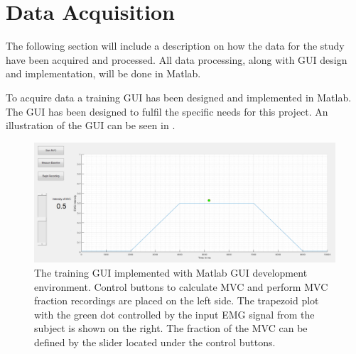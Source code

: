 \section{Data Acquisition}

The following section will include a description on how the data for the study have been acquired and processed. All data processing, along with GUI design and implementation, will be done in Matlab.

To acquire data a training GUI has been designed and implemented in Matlab. The GUI has been designed to fulfil the specific needs for this project. An illustration of the GUI can be seen in . 

\begin{figure}[H]
	\includegraphics[width=.9\textwidth]{figures/GUI/GUI_Training.png}
	\caption{The training GUI implemented with Matlab GUI development environment. Control buttons to calculate MVC and perform MVC fraction recordings are placed on the left side. The trapezoid plot with the green dot controlled by the input EMG signal from the subject is shown on the right. The fraction of the MVC can be defined by the slider located under the control buttons.}
	\label{fig:GUI_Training}
\end{figure} 



